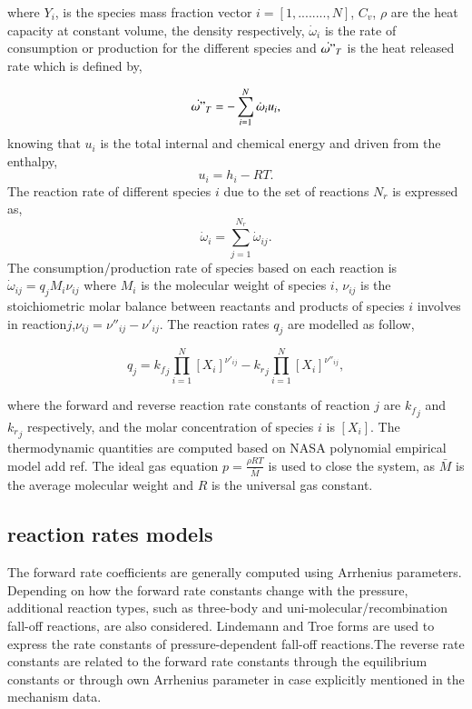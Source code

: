 \documentclass[preprint,review,12pt]{elsarticle}
\begin{document}
where $Y_i$, is the species mass fraction vector $i=[1, ........, N]	$, $C_v$, $\rho$ are the heat capacity at constant volume, the density respectively, $\dot{\omega}_i$ is the rate of consumption or production for the different species and  $\dot{\omega"}_T$ is the heat released rate which is defined by,

\begin{equation}
\label{eq:EST}
\dot{\omega"}_T=-\sum_{i=1}^{N} \dot{\omega}_i u_i,
\end{equation} 
knowing that $u_i$ is the total internal and chemical energy and driven from the enthalpy,
\begin{equation}
u_i=h_i-R T.
\end{equation} 
The reaction rate of different species $i$ due to the set of reactions $N_r$ is expressed as, 
\begin{equation}
\label{eq:SST}
\dot{\omega}_i=\sum_{j=1}^{N_r} \dot{\omega}_{ij}.
\end{equation}     
The consumption/production rate of species based on each reaction is $\dot{\omega}_{ij}= q_j {M}_i {\nu}_{ij} $ where $M_i$ is the molecular weight of species $i$, $ {\nu}_{ij}$ is the stoichiometric molar balance between reactants and products of species $i$ involves in reaction$j$,$ {\nu}_{ij}= {\nu''}_{ij}- {\nu'}_{ij}$. The reaction rates $q_j$ are modelled as follow,
 
 \begin{equation}
 q_j={k_f}_j \prod_{i=1}^{N}[X_i]^{{\nu'}_{ij}}-{k_r}_j \prod_{i=1}^{N}[X_i]^{{\nu''}_{ij}},
 \end{equation}

where the forward and reverse reaction rate constants of reaction $j$ are ${k_f}_j$ and ${k_r}_j$ respectively, and the molar concentration of species $i$ is $[X_i]$. The thermodynamic quantities are computed based on NASA polynomial empirical model {\color{red} add ref}. The ideal gas equation $p=\frac{\rho R T}{\bar{M}}$ is used to close the system, as $\bar{M}$ is the average molecular weight and $R $ is the universal gas constant. 
\subsection{reaction rates models}
The forward rate coefficients are generally computed using Arrhenius parameters. Depending on how the forward rate constants change with the pressure, additional reaction types, such as three-body and uni-molecular/recombination fall-off reactions, are also considered. Lindemann and Troe forms are used to express the rate constants of pressure-dependent fall-off reactions.The reverse rate constants are related to the forward rate constants through the equilibrium constants or through own Arrhenius parameter in case explicitly mentioned in the mechanism data. 
\end{document}
